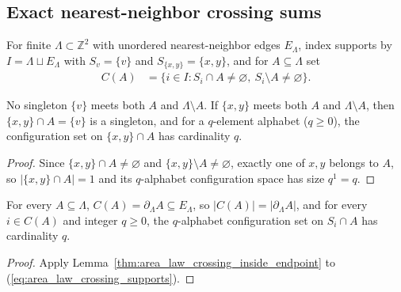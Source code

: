 \subsection{Exact nearest-neighbor crossing sums}
\label{sec:area_law_edge_crossing_budget}

\begin{definition}
    \label{def:area_law_nearest_neighbor_support}
    \leanok
    For finite $\Lambda\subset\mathbb Z^2$ with unordered nearest-neighbor edges $E_\Lambda$, index supports by $I=\Lambda\sqcup E_\Lambda$ with $S_v=\{v\}$ and $S_{\{x,y\}}=\{x,y\}$, and for $A\subseteq\Lambda$ set
    \begin{align}
        C(A) & =\{i\in I:S_i\cap A\ne\varnothing,\ S_i\setminus A\ne\varnothing\}.
        \label{eq:area_law_crossing_supports}
    \end{align}
\end{definition}

\begin{lemma}
    \label{thm:area_law_crossing_inside_endpoint}
    \leanok
    No singleton $\{v\}$ meets both $A$ and $\Lambda\setminus A$. If $\{x,y\}$ meets both $A$ and $\Lambda\setminus A$, then $\{x,y\}\cap A=\{v\}$ is a singleton, and for a $q$-element alphabet ($q\ge0$), the configuration set on $\{x,y\}\cap A$ has cardinality $q$.
\end{lemma}
\begin{proof}
    \leanok
    Since $\{x,y\}\cap A\ne\varnothing$ and $\{x,y\}\setminus A\ne\varnothing$, exactly one of $x,y$ belongs to $A$, so $|\{x,y\}\cap A|=1$ and its $q$-alphabet configuration space has size $q^1=q$.
\end{proof}

\begin{lemma}
    \label{thm:area_law_crossing_support_count}
    \leanok
    For every $A\subseteq\Lambda$, $C(A)=\partial_\Lambda A\subseteq E_\Lambda$, so $|C(A)|=|\partial_\Lambda A|$, and for every $i\in C(A)$ and integer $q\ge0$, the $q$-alphabet configuration set on $S_i\cap A$ has cardinality $q$.
\end{lemma}
\begin{proof}
    \leanok
    Apply Lemma~\ref{thm:area_law_crossing_inside_endpoint} to (\ref{eq:area_law_crossing_supports}).
\end{proof}

